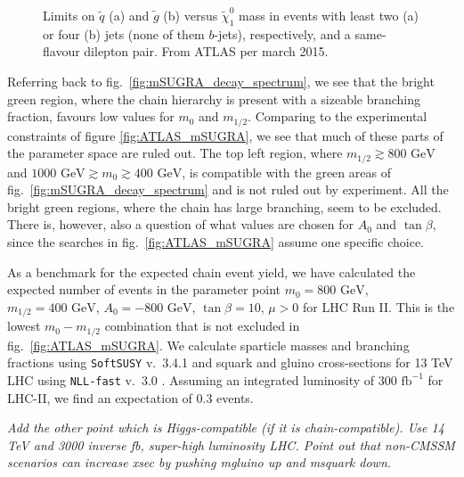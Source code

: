 \documentclass[twoside,english]{uiofysmaster}
\begin{document}
\begin{figure}[hbt]
\begin{subfigure}[b]{0.45\textwidth}
	\caption{ }
	\label{fig:ATLAS_neutralinogluino_b}
\end{subfigure}
\caption{Limits on $\tilde q$ (a) and $\tilde g$ (b) versus $\tilde \chi_1^0$ mass in events with least two (a) or four (b) jets (none of them $b$-jets), respectively, and a same-flavour dilepton pair. From ATLAS per march 2015.}
\label{fig:ATLAS_neutralinogluino}
\end{figure}

Referring back to fig.\ \ref{fig:mSUGRA_decay_spectrum}, we see that the bright green region, where the chain hierarchy is present with a sizeable branching fraction, favours low values for $m_0$ and $m_{1/2}$. Comparing to the experimental constraints of figure \ref{fig:ATLAS_mSUGRA}, we see that much of these parts of the parameter space are ruled out. The top left region, where $m_{1/2} \gtrsim 800\,\,\mathrm{GeV}$ and $1000 \,\,\mathrm{GeV} \gtrsim m_0 \gtrsim 400 \,\,\mathrm{GeV}$, is compatible with the green areas of fig.\ \ref{fig:mSUGRA_decay_spectrum} and is not ruled out by experiment. All the bright green regions, where the chain has large branching, seem to be excluded. There is, however, also a question of what values are chosen for $A_0$ and $\tan\beta$, since the searches in fig.\ \ref{fig:ATLAS_mSUGRA} assume one specific choice. 

As a benchmark for the expected chain event yield, we have calculated the expected number of events in the parameter point $m_0 = 800 \,\,\mathrm{GeV}$, $m_{1/2} = 400 \,\,\mathrm{GeV}$, $A_0 = -800\,\,\mathrm{GeV}$, $\tan\beta = 10$, $\mu>0$ for LHC Run II. This is the lowest $m_0-m_{1/2}$ combination that is not excluded in fig.\ \ref{fig:ATLAS_mSUGRA}. We calculate sparticle masses and branching fractions using {\tt SoftSUSY} v.\ 3.4.1 \cite{Allanach:2001kg} and squark and gluino cross-sections for 13 TeV LHC using {\tt NLL-fast} v.\ 3.0 \cite{Beenakker:1996ch,Kulesza:2008jb,Kulesza:2009kq,Beenakker:2009ha,Beenakker:2011fu,Beenakker:1997ut,Beenakker:2010nq}. Assuming an integrated luminosity of $300\,\,\mathrm{fb}^{-1}$ for LHC-II, we find an expectation of 0.3 events. 

{\it Add the other point which is Higgs-compatible (if it is chain-compatible). Use 14 TeV and 3000 inverse fb, super-high luminosity LHC. Point out that non-CMSSM scenarios can increase xsec by pushing mgluino up and msquark down.}
\end{document}

